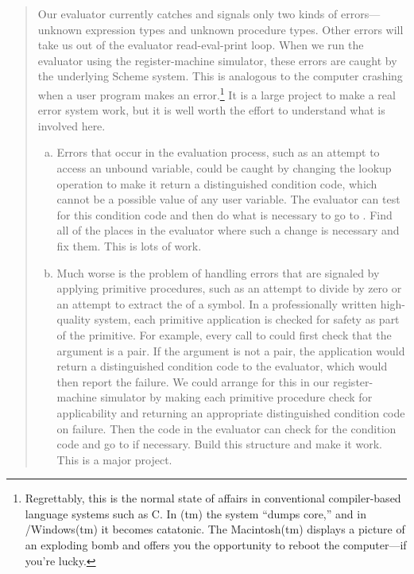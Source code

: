 \begin{quote}
 Our evaluator currently catches
and signals only two kinds of errors---unknown expression types and unknown
procedure types.  Other errors will take us out of the evaluator
read-eval-print loop.  When we run the evaluator using the register-machine
simulator, these errors are caught by the underlying Scheme system.  This is
analogous to the computer crashing when a user program makes an
error.\footnote{Regrettably, this is the normal state of affairs in
conventional compiler-based language systems such as C.  In (tm)
the system ``dumps core,'' and in /Windows(tm) it becomes
catatonic.  The Macintosh(tm) displays a picture of an exploding bomb and
offers you the opportunity to reboot the computer---if you're lucky.}  It is a
large project to make a real error system work, but it is well worth the effort
to understand what is involved here.

\begin{enumerate}[a.]

\item
Errors that occur in the evaluation process, such as an attempt to access an
unbound variable, could be caught by changing the lookup operation to make it
return a distinguished condition code, which cannot be a possible value of any
user variable.  The evaluator can test for this condition code and then do what
is necessary to go to .  Find all of the places in the
evaluator where such a change is necessary and fix them.  This is lots of work.

\item
Much worse is the problem of handling errors that are signaled by applying
primitive procedures, such as an attempt to divide by zero or an attempt to
extract the  of a symbol.  In a professionally written high-quality
system, each primitive application is checked for safety as part of the
primitive.  For example, every call to  could first check that the
argument is a pair.  If the argument is not a pair, the application would
return a distinguished condition code to the evaluator, which would then report
the failure.  We could arrange for this in our register-machine simulator by
making each primitive procedure check for applicability and returning an
appropriate distinguished condition code on failure. Then the
 code in the evaluator can check for the condition code
and go to  if necessary.  Build this structure and make it
work.  This is a major project.

\end{enumerate}
\end{quote}

